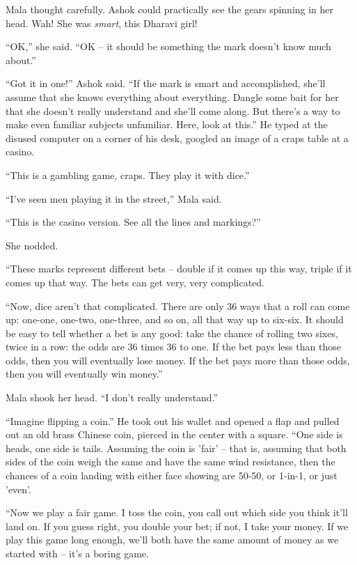 Mala thought carefully. Ashok could practically see the gears
spinning in her head. Wah! She was \emph{smart}, this Dharavi
girl!

``OK,'' she said. ``OK -- it should be something the mark doesn't know
much about.''

``Got it in one!'' Ashok said. ``If the mark is smart and
accomplished, she'll assume that she knows everything about
everything. Dangle some bait for her that she doesn't really
understand and she'll come along. But there's a way to make even
familiar subjects unfamiliar. Here, look at this.'' He typed at the
disused computer on a corner of his desk, googled an image of a
craps table at a casino.

``This is a gambling game, craps. They play it with dice.''

``I've seen men playing it in the street,'' Mala said.

``This is the casino version. See all the lines and markings?''

She nodded.

``These marks represent different bets -- double if it comes up this
way, triple if it comes up that way. The bets can get very, very
complicated.

``Now, dice aren't that complicated. There are only 36 ways that a
roll can come up: one-one, one-two, one-three, and so on, all that
way up to six-six. It should be easy to tell whether a bet is any
good: take the chance of rolling two sixes, twice in a row: the
odds are 36 times 36 to one. If the bet pays less than those odds,
then you will eventually lose money. If the bet pays more than
those odds, then you will eventually win money.''

Mala shook her head. ``I don't really understand.''

``Imagine flipping a coin.'' He took out his wallet and opened a flap
and pulled out an old brass Chinese coin, pierced in the center
with a square. ``One side is heads, one side is tails. Assuming the
coin is 'fair' -- that is, assuming that both sides of the coin
weigh the same and have the same wind resistance, then the chances
of a coin landing with either face showing are 50-50, or 1-in-1, or
just 'even'.

``Now we play a fair game. I toss the coin, you call out which side
you think it'll land on. If you guess right, you double your bet;
if not, I take your money. If we play this game long enough, we'll
both have the same amount of money as we started with -- it's a
boring game.

